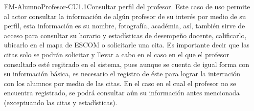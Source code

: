 \begin{UseCase}{EM-AlumnoProfesor-CU1.1}{Consultar perfil del profesor.}{
	\noindent
	Este caso de uso permite al actor consultar la información de algún
	profesor de su interés por medio de su perfil, esta información es su
	nombre, fotografía, académia, así, también sirve de acceso para consultar
	su horario y estadísticas de desempeño docente, calificarlo, ubicarlo en
	el mapa de ESCOM o solicitarle una cita. Es importante decir que las citas
	solo se podrán solicitar y llevar a cabo en el caso en el que el profesor
	consultado esté regitrado en el sistema, pues aunque se cuenta de igual
	forma con su información básica, es necesario el registro de éste para
	lograr la interración con los alumnos por medio de las citas. En el caso
	en el cual el profesor no se encuentra registrado, se podrá consultar aún
	su información antes mencionada (exceptuando las citas y estadísticas). 
	\newline
	}
\end{UseCase}

